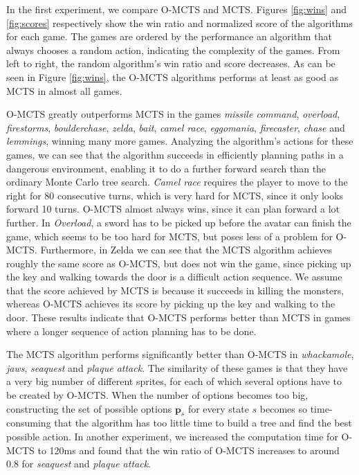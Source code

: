 In the first experiment, we compare O-MCTS and MCTS. Figures \ref{fig:wins} and
\ref{fig:scores} respectively show the win ratio and normalized score of the
algorithms for each game. The games are ordered by the performance an algorithm
that always chooses a random action, indicating the complexity of the games.
From left to right, the random algorithm's win ratio and score decreases. As can
be seen in Figure \ref{fig:wins}, the O-MCTS algorithms performs at least as
good as MCTS in almost all games. 

O-MCTS greatly outperforms MCTS in the games \textit{missile
command}, \textit{overload}, \textit{firestorms}, \textit{boulderchase},
\textit{zelda}, \textit{bait}, \textit{camel race}, \textit{eggomania},
\textit{firecaster}, \textit{chase} and \textit{lemmings}, winning many more
games. Analyzing the algorithm's actions for these games, we can see that
the algorithm succeeds in efficiently planning paths in a dangerous environment,
enabling it to do a further forward search than the ordinary Monte Carlo tree
search. \textit{Camel race} requires the player to move to the right for 80
consecutive turns, which is very hard for MCTS, since it only looks forward 10 
turns. O-MCTS almost always wins, since it can plan forward a lot further. In
\textit{Overload}, a sword has to be picked up before the avatar can finish the
game, which seems to be too hard for MCTS, but poses less of a problem for
O-MCTS.  Furthermore, in Zelda we can see that the MCTS algorithm achieves
roughly the same score as O-MCTS, but does not win the game, since picking up
the key and walking towards the door is a difficult action sequence. We assume
that the score achieved by MCTS is because it succeeds in killing the monsters,
whereas O-MCTS achieves its score by picking up the key and walking to the door.
These results indicate that O-MCTS performs better than MCTS in games where a
longer sequence of action planning has to be done.

The MCTS algorithm performs significantly better than O-MCTS in
\textit{whackamole}, \textit{jaws}, \textit{seaquest} and \textit{plaque
attack}. The similarity of these games is that they have a very big number of
different sprites, for each of which several options have to be created by
O-MCTS.  When the number of options becomes too big, constructing the set of
possible options $\mathbf{p}_s$ for every state $s$ becomes so time-consuming
that the algorithm has too little time to build a tree and find the best
possible action. In another experiment, we increased the computation time for
O-MCTS to 120ms and found that the win ratio of O-MCTS increases to around $0.8$
for \textit{seaquest} and \textit{plaque attack}.



